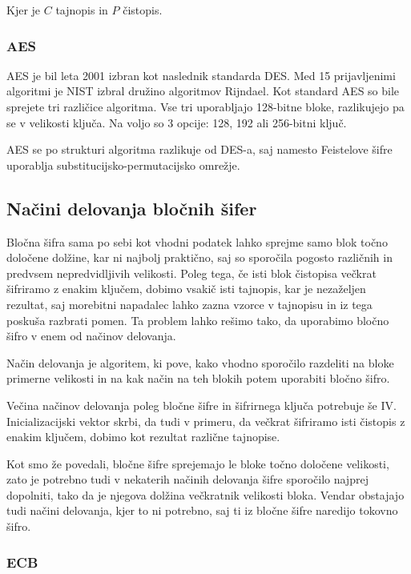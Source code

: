 \documentclass[12pt,a4paper,openany,tikz]{book}
\theoremstyle{plain}
\theoremstyle{definition}
\begin{document}
Kjer je $C$ tajnopis in $P$ čistopis.

\subsubsection{AES}
\label{subs:AES}


\gls{AES} je bil leta 2001 izbran kot naslednik standarda \gls{DES}. Med 15 prijavljenimi algoritmi je \gls{NIST} izbral družino algoritmov Rijndael. Kot standard \gls{AES} so bile sprejete tri različice algoritma. Vse tri uporabljajo 128-bitne bloke, razlikujejo pa se v velikosti ključa. Na voljo so 3 opcije: 128, 192 ali 256-bitni ključ.

\gls{AES} se po strukturi algoritma razlikuje od \gls{DES}-a, saj namesto Feistelove šifre uporablja substitucijsko-permutacijsko omrežje.

\subsection*{Načini delovanja bločnih šifer}
\label{sub:Nacini delovanja blocnih sifer}

Bločna šifra sama po sebi kot vhodni podatek lahko sprejme samo blok točno določene dolžine, kar ni najbolj praktično, saj so sporočila pogosto različnih in predvsem nepredvidljivih velikosti. Poleg tega, če isti blok čistopisa večkrat šifriramo z enakim ključem, dobimo vsakič isti tajnopis, kar je nezaželjen rezultat, saj morebitni napadalec lahko zazna vzorce v tajnopisu in iz tega poskuša razbrati pomen. Ta problem lahko rešimo tako, da uporabimo bločno šifro v enem od načinov delovanja.

Način delovanja je algoritem, ki pove, kako vhodno sporočilo razdeliti na bloke primerne velikosti in na kak način na teh blokih potem uporabiti bločno šifro.

Večina načinov delovanja poleg bločne šifre in šifrirnega ključa potrebuje še \gls{IV}. Inicializacijski vektor skrbi, da tudi v primeru, da večkrat šifriramo isti čistopis z enakim ključem, dobimo kot rezultat različne tajnopise.

Kot smo že povedali, bločne šifre sprejemajo le bloke točno določene velikosti, zato je potrebno tudi v nekaterih načinih delovanja šifre sporočilo najprej dopolniti, tako da je njegova dolžina večkratnik velikosti bloka. Vendar obstajajo tudi načini delovanja, kjer to ni potrebno, saj ti iz bločne šifre naredijo tokovno šifro.


\subsubsection{ECB}
\label{subs:ECB}
\end{document}
